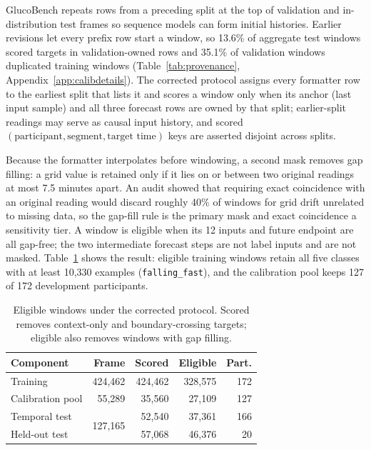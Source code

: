 \documentclass[10pt,twocolumn]{article}
\begin{document}
GlucoBench repeats rows from a preceding split at the top of validation and
in-distribution test frames so sequence models can form initial histories.
Earlier revisions let every prefix row start a window, so 13.6\% of
aggregate test windows scored targets in validation-owned rows and 35.1\%
of validation windows duplicated training windows
(Table~\ref{tab:provenance}, Appendix~\ref{app:calibdetails}). The corrected protocol assigns every
formatter row to the earliest split that lists it and scores a window only
when its anchor (last input sample) and all three forecast rows are owned
by that split; earlier-split readings may serve as causal input history,
and scored $(\text{participant}, \text{segment},
\text{target time})$ keys are asserted disjoint across splits.

Because the formatter interpolates before windowing, a second mask removes
gap filling: a grid value is retained only if it lies on or between two
original readings at most 7.5 minutes apart. An audit showed that requiring
exact coincidence with an original reading would discard roughly 40\% of
windows for grid drift unrelated to missing data, so the gap-fill rule is
the primary mask and exact coincidence a sensitivity tier. A window is
eligible when its 12 inputs and future endpoint are all gap-free; the two
intermediate forecast steps are not label inputs and are not masked.
Table~\ref{tab:eligible} shows the result: eligible training windows retain
all five classes with at least 10,330 examples (\texttt{falling\_fast}),
and the calibration pool keeps 127 of 172 development participants.

\begin{table}[t]
\centering
\caption{Eligible windows under the corrected protocol. Scored removes
context-only and boundary-crossing targets; eligible also removes windows
with gap filling.}
\label{tab:eligible}
\small
\begin{tabular}{@{}lrrrr@{}}
\toprule
Component & Frame & Scored & Eligible & Part. \\
\midrule
Training & 424,462 & 424,462 & 328,575 & 172 \\
Calibration pool & 55,289 & 35,560 & 27,109 & 127 \\
Temporal test & \multirow{2}{*}{127,165} & 52,540 & 37,361 & 166 \\
Held-out test &  & 57,068 & 46,376 & 20 \\
\bottomrule
\end{tabular}
\end{table}
\end{document}
